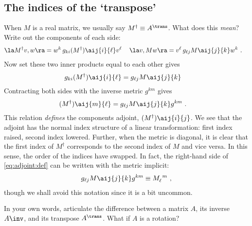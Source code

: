 \subsection{The indices of the `transpose'}
When $M$ is a real matrix, we usually say $M^\dag \equiv A^\trans$. What does this \emph{mean}? Write out the components of each side:
\begin{align}
    \la M^\dag v, w \ra
    &=
   w^k \, g_{ki}  (M^\dag)\aij{i}{\ell} v^\ell  \,  
    &
    \la  v,M w \ra
    &=
   v^\ell\, g_{\ell j}  M\aij{j}{k} w^k  
   \ .
   \label{eq:adjoint:transpose:int1}
\end{align}
Now set these two inner products equal to each other gives
\begin{align}
    g_{ki}(M^\dag)\aij{i}{\ell}
    &=
    g_{\ell j} M\aij{j}{k}
    \label{eq:adjoint:transpose:int2}
\end{align}
Contracting both sides with the inverse metric $g^{km}$ gives
\begin{align}
    (M^\dag)\aij{m}{\ell} &= g_{\ell j} M\aij{j}{k} g^{km} \ .
    \label{eq:adjoint:def}
\end{align}
This relation \emph{defines} the components adjoint, $(M^\dag)\aij{i}{j}$. We see that the adjoint has the normal index structure of a linear transformation: first index raised, second index lowered. Further, when the metric is diagonal, it is clear that the first index of $M^\dag$ corresponds to the second index of $M$ and vice  versa. In this sense, the order of the indices have swapped.  In fact, the right-hand side of  \eqref{eq:adjoint:def} can be written with the metric implicit:
\begin{align}
    g_{\ell j} M\aij{j}{k} g^{km} \equiv 
    M_\ell^{\phantom{\ell}m} \ ,
\end{align}
though we shall avoid this notation since it is a bit uncommon.



\begin{exercise}
In your own words, articulate the difference between a matrix $A$, its inverse $A\inv$, and its transpose $A^\trans$. What if $A$ is a rotation?
\end{exercise}

